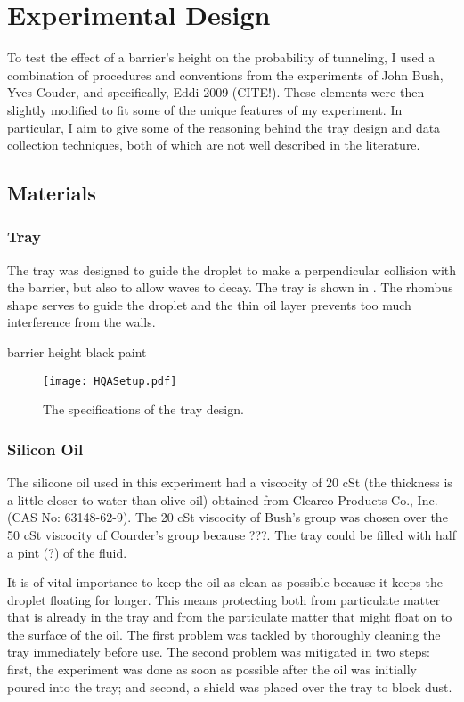 \chapter{Experimental Design}

To test the effect of a barrier's height on the probability of tunneling, I used a combination of procedures and conventions from the experiments of John Bush, Yves Couder, and specifically, Eddi 2009 (CITE!). These elements were then slightly modified to fit some of the unique features of my experiment. In particular, I aim to give some of the reasoning behind the tray design and data collection techniques, both of which are not well described in the literature.

\section{Materials}
\subsection{Tray}
The tray was designed to guide the droplet to make a perpendicular collision with the barrier, but also to allow waves to decay. The tray is shown in . The rhombus shape serves to guide the droplet and the thin oil layer prevents too much interference from the walls. 

barrier height
black paint



\begin{figure}[h]
	\centering
	\texttt{[image: HQASetup.pdf]}
	\caption{The specifications of the tray design. }
	\label{tray}
\end{figure}

\subsection{Silicon Oil}
    The silicone oil used in this experiment had a viscocity of 20 cSt (the thickness is a little closer to water than olive oil) obtained from Clearco Products Co., Inc. (CAS No: 63148-62-9). The 20 cSt viscocity of Bush's group was chosen over the 50 cSt viscocity of Courder's group because ???. The tray could be filled with half a pint (?) of the fluid.
    
    It is of vital importance to keep the oil as clean as possible because it keeps the droplet floating for longer. This means protecting both from particulate matter that is already in the tray and from the particulate matter that might float on to the surface of the oil. The first problem was tackled by thoroughly cleaning the tray immediately before use. The second problem was mitigated in two steps: first, the experiment was done as soon as possible after the oil was initially poured into the tray; and second, a shield was placed over the tray to block dust.     

